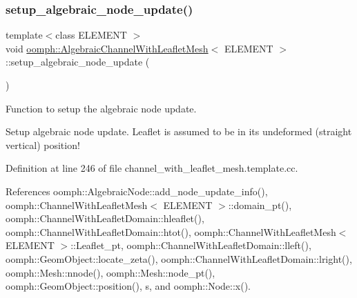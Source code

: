 \mbox{\label{classoomph_1_1AlgebraicChannelWithLeafletMesh_a0d6cb8a8ffa830cdd73aa0f6686f150f}} 
\subsubsection{\texorpdfstring{setup\+\_\+algebraic\+\_\+node\+\_\+update()}{setup\_algebraic\_node\_update()}}
{\footnotesize\ttfamily template$<$class E\+L\+E\+M\+E\+NT $>$ \\
void \hyperlink{classoomph_1_1AlgebraicChannelWithLeafletMesh}{oomph\+::\+Algebraic\+Channel\+With\+Leaflet\+Mesh}$<$ E\+L\+E\+M\+E\+NT $>$\+::setup\+\_\+algebraic\+\_\+node\+\_\+update (\begin{DoxyParamCaption}{ }\end{DoxyParamCaption})\hspace{0.3cm}{\ttfamily [protected]}}



Function to setup the algebraic node update. 

Setup algebraic node update. Leaflet is assumed to be in its undeformed (straight vertical) position! 

Definition at line 246 of file channel\+\_\+with\+\_\+leaflet\+\_\+mesh.\+template.\+cc.



References oomph\+::\+Algebraic\+Node\+::add\+\_\+node\+\_\+update\+\_\+info(), oomph\+::\+Channel\+With\+Leaflet\+Mesh$<$ E\+L\+E\+M\+E\+N\+T $>$\+::domain\+\_\+pt(), oomph\+::\+Channel\+With\+Leaflet\+Domain\+::hleaflet(), oomph\+::\+Channel\+With\+Leaflet\+Domain\+::htot(), oomph\+::\+Channel\+With\+Leaflet\+Mesh$<$ E\+L\+E\+M\+E\+N\+T $>$\+::\+Leaflet\+\_\+pt, oomph\+::\+Channel\+With\+Leaflet\+Domain\+::lleft(), oomph\+::\+Geom\+Object\+::locate\+\_\+zeta(), oomph\+::\+Channel\+With\+Leaflet\+Domain\+::lright(), oomph\+::\+Mesh\+::nnode(), oomph\+::\+Mesh\+::node\+\_\+pt(), oomph\+::\+Geom\+Object\+::position(), s, and oomph\+::\+Node\+::x().

\mbox{\label{classoomph_1_1AlgebraicChannelWithLeafletMesh_ab3659949ea5faac4ffa981828e98cf53}} 
